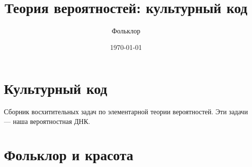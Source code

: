 \documentclass[nobib]{tufte-handout}
\title{Теория вероятностей: культурный код}
\author{Фольклор}
\date{\today}
\theoremstyle{definition}
\begin{document}
\maketitle

\section{Культурный код}

Сборник восхитительных задач по элементарной теории вероятностей.
Эти задачи — наша вероятностная ДНК.

\section{Фольклор и красота}


\end{document}
